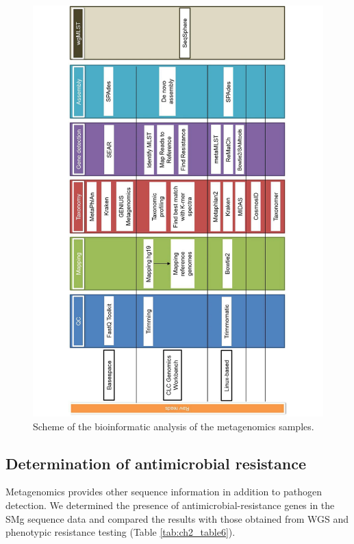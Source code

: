 \begin{landscape}

\end{landscape}

\begin{figure}[h!]
\centering
\includegraphics[angle=-90,width=\textwidth]{figures/chapter 2/41598_2018_31873_Fig1_HTML.pdf}
\caption{Scheme of the bioinformatic analysis of the metagenomics samples.}
\label{fig:chap2_figure1}
\end{figure}

\subsection{Determination of antimicrobial resistance}

Metagenomics provides other sequence information in addition to pathogen detection. 
We determined the presence of antimicrobial-resistance genes in the \ac{SMg} sequence data and compared the results with those obtained from \ac{WGS} and phenotypic resistance testing (Table \ref{tab:ch2_table6}).

